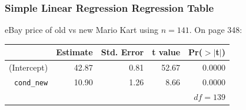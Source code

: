 \documentclass[handout]{beamer}
\newcommand{\blue}[1]{\textcolor{blue2}{#1}}
\begin{document}

%
%
%
%
%


\begin{frame}[fragile]
\frametitle{Simple Linear Regression Regression Table}

eBay price of old vs new Mario Kart using $n=141$.  On page 348:

\begin{table}[ht]
\centering
\begin{tabular}{r|rrrr}
  \hline
 & Estimate & Std. Error & t value & Pr($>$$|$t$|$) \\ 
  \hline
(Intercept) & 42.87 & 0.81 & 52.67 & 0.0000 \\ 
{\tt cond\_new} & 10.90 & 1.26 & 8.66 & 0.0000 \\ 
   \hline
   & & & & $df=139$\\
\end{tabular}
\end{table}

%
%

\end{frame}
\end{document}
